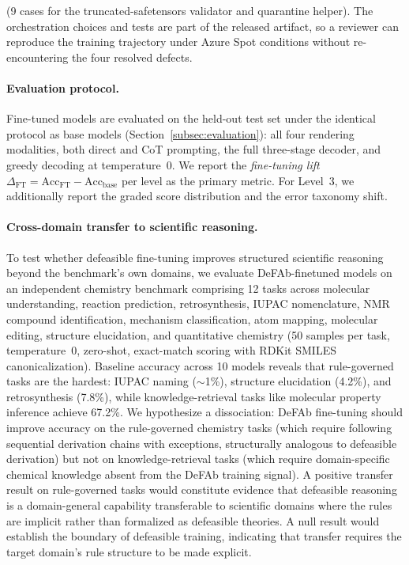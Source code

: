 \documentclass{article}
\theoremstyle{definition}
\begin{document}
(9 cases for the truncated-safetensors validator and quarantine helper). The orchestration choices and tests are part of the released artifact, so a reviewer can reproduce the training trajectory under Azure Spot conditions without re-encountering the four resolved defects.

\paragraph{Evaluation protocol.} Fine-tuned models are evaluated on the held-out test set under the identical protocol as base models (Section~\ref{subsec:evaluation}): all four rendering modalities, both direct and CoT prompting, the full three-stage decoder, and greedy decoding at temperature~$0$. We report the \emph{fine-tuning lift} $\Delta_{\mathrm{FT}} = \mathrm{Acc}_{\mathrm{FT}} - \mathrm{Acc}_{\mathrm{base}}$ per level as the primary metric. For Level~3, we additionally report the graded score distribution and the error taxonomy shift.

\paragraph{Cross-domain transfer to scientific reasoning.} To test whether defeasible fine-tuning improves structured scientific reasoning beyond the benchmark's own domains, we evaluate DeFAb-finetuned models on an independent chemistry benchmark comprising 12 tasks across molecular understanding, reaction prediction, retrosynthesis, IUPAC nomenclature, NMR compound identification, mechanism classification, atom mapping, molecular editing, structure elucidation, and quantitative chemistry (50 samples per task, temperature~$0$, zero-shot, exact-match scoring with RDKit SMILES canonicalization). Baseline accuracy across 10 models reveals that rule-governed tasks are the hardest: IUPAC naming ($\sim$1\%), structure elucidation (4.2\%), and retrosynthesis (7.8\%), while knowledge-retrieval tasks like molecular property inference achieve 67.2\%. We hypothesize a dissociation: DeFAb fine-tuning should improve accuracy on the rule-governed chemistry tasks (which require following sequential derivation chains with exceptions, structurally analogous to defeasible derivation) but not on knowledge-retrieval tasks (which require domain-specific chemical knowledge absent from the DeFAb training signal). A positive transfer result on rule-governed tasks would constitute evidence that defeasible reasoning is a domain-general capability transferable to scientific domains where the rules are implicit rather than formalized as defeasible theories. A null result would establish the boundary of defeasible training, indicating that transfer requires the target domain's rule structure to be made explicit.
\end{document}
